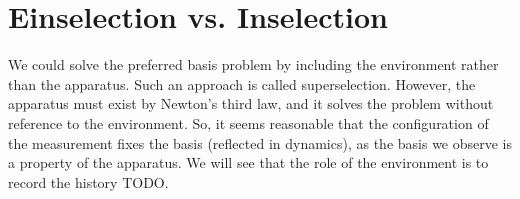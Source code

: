 %
%
%
%
%

%
%

\section{Einselection vs. Inselection}
We could solve the preferred basis problem by including the environment rather than the apparatus. Such an approach is called superselection. However, the apparatus must exist by Newton's third law, and it solves the problem without reference to the environment. So, it seems reasonable that the configuration of the measurement fixes the basis (reflected in dynamics), as the basis we observe is a property of the apparatus. We will see that the role of the environment is to record the history TODO.
